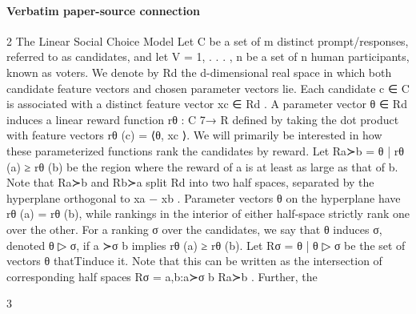 \documentclass[10pt]{article}
\begin{document}
\paragraph{Verbatim paper-source connection}
\begin{ReviewVerbatim}
2     The Linear Social Choice Model
Let C be a set of m distinct prompt/responses, referred to as candidates, and let V = {1, . . . , n} be
a set of n human participants, known as voters. We denote by Rd the d-dimensional real space in
which both candidate feature vectors and chosen parameter vectors lie.
Each candidate c ∈ C is associated with a distinct feature vector xc ∈ Rd . A parameter vector
θ ∈ Rd induces a linear reward function rθ : C 7→ R defined by taking the dot product with feature
vectors rθ (c) = ⟨θ, xc ⟩. We will primarily be interested in how these parameterized functions rank
the candidates by reward. Let Ra≻b = {θ | rθ (a) ≥ rθ (b)} be the region where the reward of a is
at least as large as that of b. Note that Ra≻b and Rb≻a split Rd into two half spaces, separated by
the hyperplane orthogonal to xa − xb . Parameter vectors θ on the hyperplane have rθ (a) = rθ (b),
while rankings in the interior of either half-space strictly rank one over the other.
For a ranking σ over the candidates, we say that θ induces σ, denoted θ ▷ σ, if a ≻σ b implies
rθ (a) ≥ rθ (b). Let Rσ = {θ | θ ▷ σ} be the set of vectors θ thatTinduce it. Note that this can
be written as the intersection of corresponding half spaces Rσ = a,b:a≻σ b Ra≻b . Further, the


                                                    3


\end{ReviewVerbatim}
\end{document}

